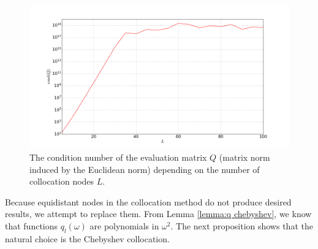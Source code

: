 \documentclass[a4paper,11pt,bibliography=totoc,listof=totoc,headinclude=true,cleardoublepage=empty,oneside]{scrbook}
\begin{document}
\begin{figure}
    \centering
    \includegraphics[width=1\linewidth]{latex//images//equi_coll/Figure_2.png}
    \caption{The condition number of the evaluation matrix $Q$ (matrix norm induced by the Euclidean norm) depending on the number of collocation nodes $L$.}
    \label{fig:eq coll cond}
\end{figure}

Because equidistant nodes in the collocation method do not produce desired results, we attempt to replace them. From Lemma \ref{lemma:q chebyshev}, we know that functions $q_l(\omega)$ are polynomials in $\omega^2$. The next proposition shows that the natural choice is the Chebyshev collocation.
\end{document}
